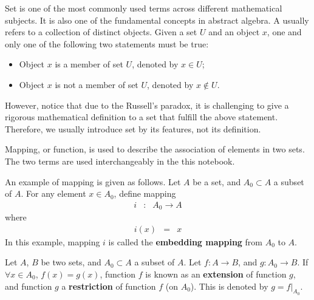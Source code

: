 Set is one of the most commonly used terms across different mathematical subjects. It is also one of the fundamental concepts in abstract algebra. A  usually refers to a collection of distinct objects. Given a set $U$ and an object $x$, one and only one of the following two statements must be true:
\begin{itemize}
  \item Object $x$ is a member of set $U$, denoted by $x \in U$;
  \item Object $x$ is not a member of set $U$, denoted by $x \notin U$.
\end{itemize}
However, notice that due to the Russell's paradox, it is challenging to give a rigorous mathematical definition to a set that fulfill the above statement. Therefore, we usually introduce set by its features, not its definition.

Mapping, or function, is used to describe the association of elements in two sets. The two terms are used interchangeably in the this notebook. 

An example of mapping is given as follows. Let $A$ be a set, and $A_0 \subset A$ a subset of $A$. For any element $x\in A_0$, define mapping
\begin{eqnarray}
  i &:& A_0 \rightarrow A \nonumber
\end{eqnarray}
where
\begin{eqnarray}
  i(x) &=& x \nonumber
\end{eqnarray}
In this example, mapping $i$ is called the \textbf{embedding mapping} from $A_0$ to $A$.

Let $A$, $B$ be two sets, and $A_0 \subset A$ a subset of $A$. Let $f: A\rightarrow B$, and $g: A_0\rightarrow B$. If $\forall x\in A_0$, $f(x)=g(x)$, function $f$ is known as an \textbf{extension} of function $g$, and function $g$ a \textbf{restriction} of function $f$ (on $A_0$). This is denoted by $g=f|_{A_0}$.

